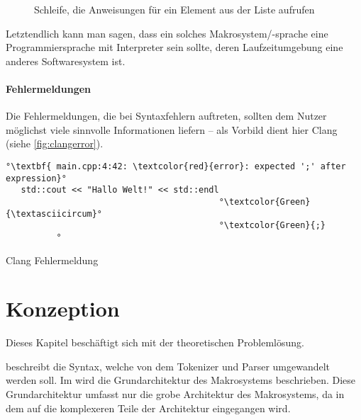     \begin{figure}[H]
      \centering
      \caption{Schleife, die Anweisungen für ein Element aus der Liste aufrufen}
      \label{fig:loop}
    \end{figure}

    Letztendlich kann man sagen, dass ein solches Makrosystem/-sprache eine Programmiersprache mit Interpreter \autocite[S.274]{Gamma:1995:DPE:186897} sein sollte, deren Laufzeitumgebung eine anderes Softwaresystem ist.

    \paragraph{Fehlermeldungen}
      Die Fehlermeldungen, die bei Syntaxfehlern auftreten, sollten dem Nutzer möglichst viele sinnvolle Informationen liefern -- als Vorbild dient hier Clang (siehe \autoref{fig:clangerror}).

      \begin{myCodeEnv}
        \centering
        \begin{myInvBox}[width=.9\linewidth]
          \begin{lstlisting}[keepspaces,escapechar=°,numbers=none]
°\textbf{ main.cpp:4:42: \textcolor{red}{error}: expected ';' after expression}°
   std::cout << "Hallo Welt!" << std::endl
                                          °\textcolor{Green}{\textasciicircum}°
                                          °\textcolor{Green}{;}
          °\end{lstlisting}
        \end{myInvBox}
        \caption{Clang Fehlermeldung}
        \label{fig:clangerror}
      \end{myCodeEnv}

\section{Konzeption}
\label{sec:Konzeption}
  Dieses Kapitel beschäftigt sich mit der theoretischen Problemlösung.

   beschreibt die Syntax, welche von dem Tokenizer und Parser umgewandelt werden soll. Im  wird die Grundarchitektur des Makrosystems beschrieben. Diese Grundarchitektur umfasst nur die grobe Architektur des Makrosystems, da in dem  auf die komplexeren Teile der Architektur eingegangen wird.

